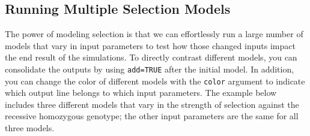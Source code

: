 \documentclass[
]{book}
\begin{document}
\hypertarget{running-multiple-selection-models}{%
\subsection{Running Multiple Selection Models}\label{running-multiple-selection-models}}

The power of modeling selection is that we can effortlessly run a large number of models that vary in input parameters to test how those changed inputs impact the end result of the simulations. To directly contrast different models, you can consolidate the outputs by using \texttt{add=TRUE} after the initial model. In addition, you can change the color of different models with the \texttt{color} argument to indicate which output line belongs to which input parameters. The example below includes three different models that vary in the strength of selection against the recessive homozygous genotype; the other input parameters are the same for all three models.
\end{document}

